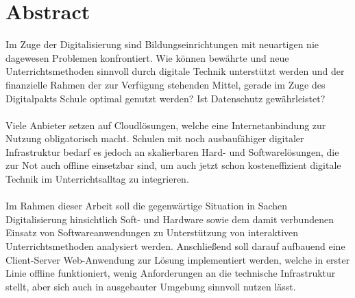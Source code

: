 \section*{Abstract}\label{sec:abstract}
Im Zuge der Digitalisierung sind Bildungseinrichtungen mit  
neuartigen nie dagewesen Problemen konfrontiert. 
Wie können bewährte und neue Unterrichtsmethoden sinnvoll durch digitale
Technik unterstützt werden und der finanzielle Rahmen der zur Verfügung stehenden
Mittel, gerade im Zuge des Digitalpakts Schule optimal genutzt werden? Ist Datenschutz gewährleistet? 
\\ \\
Viele Anbieter setzen auf Cloudlösungen, welche eine Internetanbindung zur Nutzung obligatorisch macht. Schulen mit noch ausbaufähiger digitaler Infrastruktur 
bedarf es jedoch an skalierbaren Hard- und Softwarelösungen, die zur Not auch offline einsetzbar sind, um auch jetzt schon kosteneffizient digitale Technik im Unterrichtsalltag zu integrieren.
\\ \\  
Im Rahmen dieser Arbeit soll die gegenwärtige Situation in Sachen Digitalisierung hinsichtlich Soft- und Hardware sowie dem damit verbundenen Einsatz von Softwareanwendungen zu Unterstützung von interaktiven Unterrichtsmethoden analysiert werden. Anschließend soll darauf aufbauend eine Client-Server Web-Anwendung zur Lösung implementiert werden, welche in erster Linie offline funktioniert, wenig Anforderungen an die technische Infrastruktur stellt, aber sich auch in ausgebauter Umgebung sinnvoll nutzen lässt. 